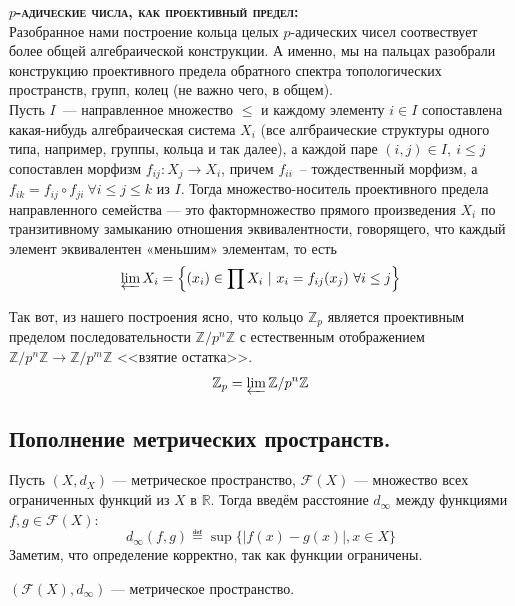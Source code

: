 \documentclass[11pt]{article}
\begin{document}
    \textbf{\textsc{$p$-адические числа, как проективный предел:}}\\
    Разобранное нами построение кольца целых $p$-адических чисел соотвествует более общей алгебраической конструкции. А именно, мы на пальцах разобрали конструкцию
    проективного предела обратного спектра топологических пространств, групп, колец (не важно чего, в общем).\\

    Пусть $I$~--- направленное множество $\le$ и каждому элементу $i \in I$ сопоставлена какая-нибудь алгебраическая система $X_i$ (все алгбраические структуры одного типа, например,
    группы, кольца и так далее), а каждой паре $(i, j) \in I, \ i \le j$ сопоставлен морфизм $f_{ij}\colon X_j \to X_i$, причем $f_{ii}$~-- тождественный морфизм, а
    $f_{ik} = f_{ij} \circ f_{ji} \ \forall i \le j \le k$ из $I$.
    Тогда множество-носитель проективного предела направленного семейства — это фактормножество прямого произведения  $X_i$ по транзитивному замыканию отношения эквивалентности, говорящего, что каждый элемент эквивалентен «меньшим» элементам, то есть
    \[ \varprojlim X_i = \left\{ (x_i) \in \prod X_i \ | \ x_i = f_{ij}(x_j) \ \forall i \le j \right\}\]

    Так вот, из нашего построения ясно, что кольцо $\mathbb{Z}_p$ является проективным пределом последовательности $\mathbb{Z}/p^n\mathbb{Z}$ с естественным отображением $\mathbb{Z}/p^n\mathbb{Z} \to \mathbb{Z}/p^m\mathbb{Z}$ <<взятие остатка>>.
    \[ \mathbb{Z}_p = \varprojlim \mathbb{Z}/p^n\mathbb{Z} \]
    \subsection{Пополнение метрических пространств.}

    \begin{definition}
    Пусть $(X, d_X)$ --- метрическое пространство, $\mathcal{F}(X)$ --- множество всех ограниченных функций из $X$ в $\mathbb{R}$. Тогда введём расстояние $d_{\infty}$ между функциями $f, g \in \mathcal{F}(X)$:
    \begin{equation*}
        d_{\infty}(f, g) \eqdef \sup\{|f(x) - g(x)|, x \in X\}
    \end{equation*}
    Заметим, что определение корректно, так как функции ограничены.
    \end{definition}

    \begin{lemma}

    $(\mathcal{F}(X), d_{\infty})$ --- метрическое пространство.

    \end{lemma}
\end{document}
